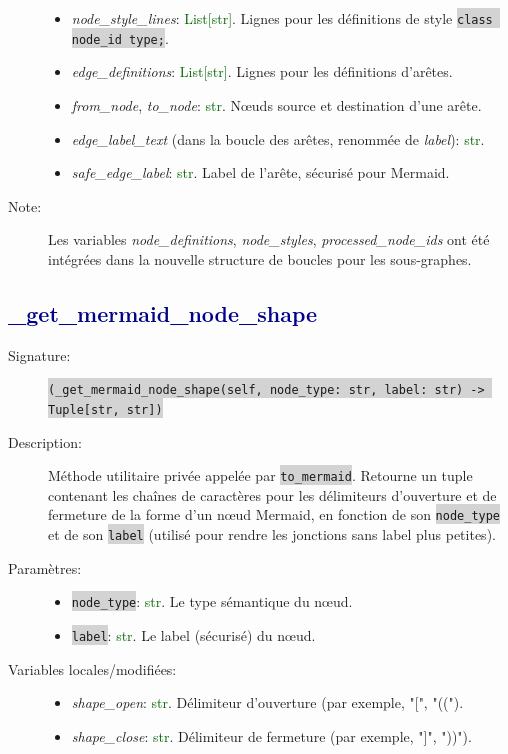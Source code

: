 \documentclass[11pt,a4paper]{article}
\newcommand{\code}[1]{\colorbox{lightgray}{\texttt{\small #1}}}
\newcommand{\var}[1]{\textit{#1}}
\newcommand{\vartype}[1]{\textcolor{darkgreen}{#1}}
\newcommand{\methodname}[1]{\textbf{\textcolor{darkblue}{#1}}}
\newcommand{\param}[1]{\code{#1}}
\begin{document}
\begin{description}
\begin{itemize}
        \item \var{node\_style\_lines}: \vartype{List[str]}. Lignes pour les définitions de style \code{class node\_id type;}.
        \item \var{edge\_definitions}: \vartype{List[str]}. Lignes pour les définitions d'arêtes.
        \item \var{from\_node}, \var{to\_node}: \vartype{str}. Nœuds source et destination d'une arête.
        \item \var{edge\_label\_text} (dans la boucle des arêtes, renommée de \var{label}): \vartype{str}.
        \item \var{safe\_edge\_label}: \vartype{str}. Label de l'arête, sécurisé pour Mermaid.
    \end{itemize}
    \item[Note:] Les variables \var{node\_definitions}, \var{node\_styles}, \var{processed\_node\_ids} ont été intégrées dans la nouvelle structure de boucles pour les sous-graphes.
\end{description}

\subsection*{\methodname{\_get\_mermaid\_node\_shape}}
\begin{description}
    \item[Signature:] \code{(\_get\_mermaid\_node\_shape(self, node\_type: str, label: str) -> Tuple[str, str])}
    \item[Description:] Méthode utilitaire privée appelée par \code{to\_mermaid}. Retourne un tuple contenant les chaînes de caractères pour les délimiteurs d'ouverture et de fermeture de la forme d'un nœud Mermaid, en fonction de son \param{node\_type} et de son \param{label} (utilisé pour rendre les jonctions sans label plus petites).
    \item[Paramètres:]
    \begin{itemize}
        \item \param{node\_type}: \vartype{str}. Le type sémantique du nœud.
        \item \param{label}: \vartype{str}. Le label (sécurisé) du nœud.
    \end{itemize}
    \item[Variables locales/modifiées:]
    \begin{itemize}
        \item \var{shape\_open}: \vartype{str}. Délimiteur d'ouverture (par exemple, "[", "((").
        \item \var{shape\_close}: \vartype{str}. Délimiteur de fermeture (par exemple, "]", "))").
    \end{itemize}
\end{description}
\end{document}
